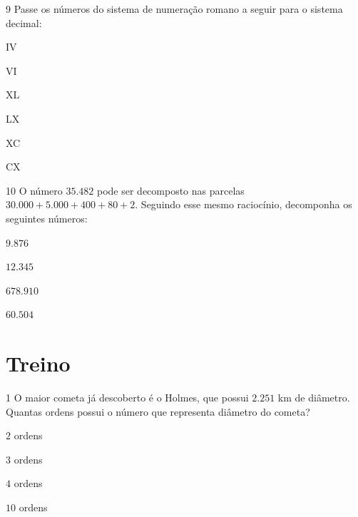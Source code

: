 \num{9}  Passe os números do sistema de numeração romano a seguir para o
sistema decimal:

\begin{escolha}
\item IV 
\item VI 
\item XL 
\item LX 
\item XC 
\item CX 
\end{escolha}

\num{10}  O número $35.482$ pode ser decomposto nas parcelas $30.000 + 5.000 +
400 + 80 + 2$. Seguindo esse mesmo raciocínio, decomponha os seguintes
números:

\begin{escolha}
\item $9.876$ 
\item $12.345$ 
\item $678.910$ 
\item $60.504$ 
\end{escolha}





\section{Treino}

\num{1}  O maior cometa já descoberto é o Holmes, que possui $2.251$ km de
diâmetro. Quantas ordens possui o número que representa diâmetro do cometa?

\begin{escolha}
\item $2$ ordens
\item $3$ ordens
\item $4$ ordens
\item $10$ ordens
\end{escolha}


